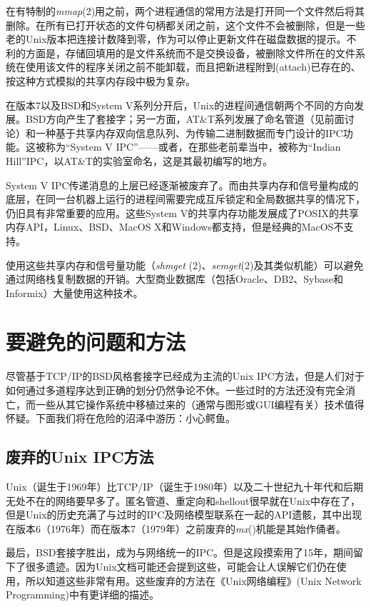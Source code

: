 \documentclass[12pt,oneside]{book}
\begin{document}
\begin{common-format}
在有特制的\textit{mmap}(2)用之前，两个进程通信的常用方法是打开同一个文件然后将其删除。在所有已打开状态的文件句柄都关闭之前，这个文件不会被删除，但是一些老的Unix版本把连接计数降到零，作为可以停止更新文件在磁盘数据的提示。不利的方面是，存储回填用的是文件系统而不是交换设备，被删除文件所在的文件系统在使用该文件的程序关闭之前不能卸载，而且把新进程附到(attach)已存在的、按这种方式模拟的共享内存段中极为复杂。

在版本7以及BSD和System V系列分开后，Unix的进程间通信朝两个不同的方向发展。BSD方向产生了套接字；另一方面，AT\&{}T系列发展了命名管道（见前面讨论）和一种基于共享内存双向信息队列、为传输二进制数据而专门设计的IPC功能。这被称为“System V IPC”——或者，在那些老前辈当中，被称为“Indian Hill”IPC，以AT\&{}T的实验室命名，这是其最初编写的地方。

System V IPC传递消息的上层已经逐渐被废弃了。而由共享内存和信号量构成的底层，在同一台机器上运行的进程间需要完成互斥锁定和全局数据共享的情况下，仍旧具有非常重要的应用。这些System V的共享内存功能发展成了POSIX的共享内存API，Linux、BSD、MacOS X和Windows都支持，但是经典的MacOS不支持。

使用这些共享内存和信号量功能（\textit{shmget }(2)、\textit{semget}(2)及其类似机能）可以避免通过网络栈复制数据的开销。大型商业数据库（包括Oracle、DB2、Sybase和Informix）大量使用这种技术。



\section{要避免的问题和方法}
尽管基于TCP/IP的BSD风格套接字已经成为主流的Unix IPC方法，但是人们对于如何通过多道程序达到正确的划分仍然争论不休。一些过时的方法还没有完全消亡，而一些从其它操作系统中移植过来的（通常与图形或GUI编程有关）技术值得怀疑。下面我们将在危险的沼泽中游历：小心鳄鱼。


\subsection{废弃的Unix IPC方法}
Unix（诞生于1969年）比TCP/IP（诞生于1980年）以及二十世纪九十年代和后期无处不在的网络要早多了。匿名管道、重定向和shellout很早就在Unix中存在了，但是Unix的历史充满了与过时的IPC及网络模型联系在一起的API遗骸，其中出现在版本6（1976年）而在版本7（1979年）之前废弃的\textit{mx}()机能是其始作俑者。

最后，BSD套接字胜出，成为与网络统一的IPC。但是这段摸索用了15年，期间留下了很多遗迹。因为Unix文档可能还会提到这些，可能会让人误解它们仍在使用，所以知道这些非常有用。这些废弃的方法在《Unix网络编程》(Unix Network Programming)\cite{Stevens90}中有更详细的描述。


\end{common-format}
\end{document}

